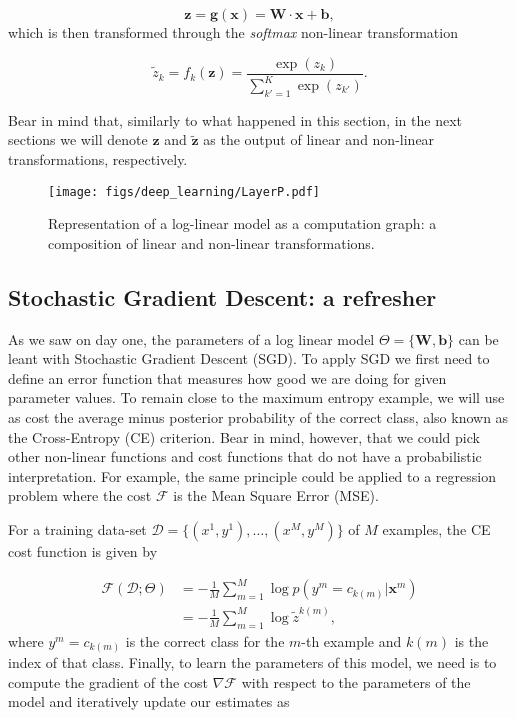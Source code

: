 \begin{equation}
\mathbf{z} = \mathbf{g}(\mathbf{x}) = \mathbf{W} \cdot \mathbf{x} + \mathbf{b},
\label{eq:linear}
\end{equation}
%
which is then transformed through the \textit{softmax} non-linear
transformation

\begin{equation}
\tilde{z}_k = f_k(\mathbf{z}) = \frac{\exp(z_k)}{\sum_{k'=1}^{K} \exp(z_{k'})}.
\label{eq:softmax}
\end{equation}

Bear in mind that, similarly to what happened in this section, in the next sections we will denote $\mathbf{z}$ and
$\tilde{\mathbf{z}}$ as the output of linear and non-linear
transformations, respectively.

\begin{figure}
\centering
\texttt{[image: figs/deep\_learning/LayerP.pdf]}
\caption{Representation of a log-linear model as a computation graph: a
composition of linear and non-linear transformations. }
\label{fig:LayerP}
\end{figure}

\subsection{Stochastic Gradient Descent: a refresher}

As we saw on day one, the parameters of a log linear model
$\Theta=\{\mathbf{W}, \mathbf{b}\}$ can be leant with Stochastic Gradient Descent (SGD). To apply SGD we first need to define an error function that measures how
good we are doing for given parameter values. %
 To remain close to the maximum
entropy example, we will use as cost the average minus posterior probability of
the correct class, also known as the Cross-Entropy (CE) criterion. Bear in
mind, however, that we could pick other non-linear functions and cost functions
that do not have
a probabilistic interpretation. For example, the same principle could be applied to
a regression problem where the cost $\mathcal{F}$ is the Mean Square Error (MSE).

For a training data-set $\mathcal{D} = \{(x^1,y^1), \ldots, (x^M,y^M)\}$ of $M$ examples, the CE cost function is given by

\begin{align}
\mathcal{F}(\mathcal{D};\Theta) 
& = -\frac{1}{M}\sum_{m=1}^{M} \log p(y^m=c_{k(m)} | \mathbf{x}^m) \\
& = -\frac{1}{M}\sum_{m=1}^{M} \log \tilde{{z}}^{k(m)} ,
\label{eq:CostLogPos}
\end{align}
%
where $y^m=c_{k(m)}$ is the correct class for the $m$-th
example and $k(m)$ is the index of that class.
Finally, to learn the parameters of this model, we need is to compute the gradient
of the cost $\nabla\mathcal{F}$ with respect to the parameters of the model and
iteratively update our estimates as 

